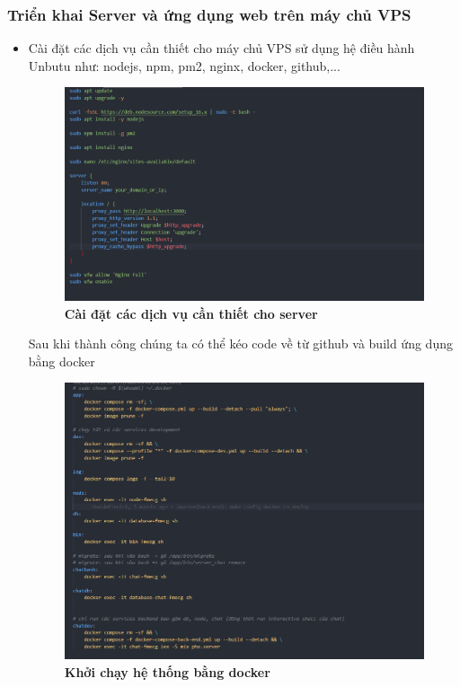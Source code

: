 \subsubsection{Triển khai Server và ứng dụng web trên máy chủ VPS}
\begin{itemize}
  \item Cài đặt các dịch vụ cần thiết cho máy chủ VPS sử dụng hệ điều hành Unbutu như: nodejs, npm, pm2, nginx, docker, github,...

  \begin{figure}[H]
    \centering
    \includegraphics[scale=0.5]{Images/server/deploy/config_server.png}
    \caption[Cài đặt các dịch vụ cần thiết cho server]{\bfseries \fontsize{12pt}{0pt}
    \selectfont Cài đặt các dịch vụ cần thiết cho server}
    \label{create_server} %
  \end{figure}

  Sau khi thành công chúng ta có thể kéo code về từ github và build ứng dụng bằng docker 
  
  \begin{figure}[H]
    \centering
    \includegraphics[scale=0.5]{Images/server/deploy/docker-run.png}
    \caption[Khởi chạy hệ thống bằng docker]{\bfseries \fontsize{12pt}{0pt}
    \selectfont Khởi chạy hệ thống bằng docker}
    \label{docker-run} %
  \end{figure}


\end{itemize}
